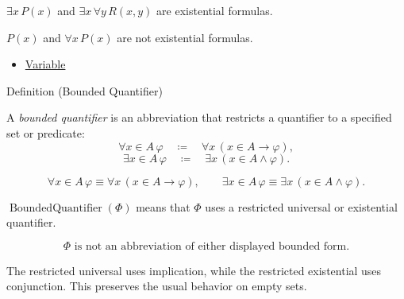 \begin{remark*}[Examples]
\(\exists x\,P(x)\) and \(\exists x\,\forall y\,R(x,y)\) are existential
formulas.
\end{remark*}

\begin{remark*}
\(P(x)\) and \(\forall x\,P(x)\) are not existential formulas.
\end{remark*}

\begin{dependencies}
\begin{itemize}
  \item \hyperref[def:variable]{Variable}
\end{itemize}
\end{dependencies}

\begin{definitionbox}{Definition (Bounded Quantifier)}
\begin{definition}
\label{def:bounded-q}
A \emph{bounded quantifier} is an abbreviation that restricts a quantifier to a
specified set or predicate:
\[
\forall x\in A\,\varphi
\quad\coloneqq\quad
\forall x\,(x\in A\to\varphi),
\]
\[
\exists x\in A\,\varphi
\quad\coloneqq\quad
\exists x\,(x\in A\land\varphi).
\]
\end{definition}
\end{definitionbox}

\begin{remark*}
\[
\forall x\in A\,\varphi \equiv \forall x\,(x\in A\to\varphi),
\qquad
\exists x\in A\,\varphi \equiv \exists x\,(x\in A\land\varphi).
\]
\end{remark*}

\begin{remark*}
\(\operatorname{BoundedQuantifier}(\Phi)\) means that \(\Phi\) uses a
restricted universal or existential quantifier.
\end{remark*}

\begin{remark*}
\[
\Phi \text{ is not an abbreviation of either displayed bounded form.}
\]
\end{remark*}

\begin{remark*}[Interpretation]
The restricted universal uses implication, while the restricted existential
uses conjunction. This preserves the usual behavior on empty sets.
\end{remark*}

